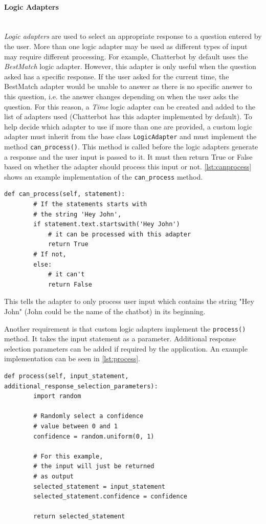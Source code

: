 \documentclass[12pt,a4paper]{article}
\newcommand{\myparagraph}[1]{\paragraph{#1}\mbox{}\\} %
\begin{document}
\myparagraph{Logic Adapters}
\textit{Logic adapters} are used to select an appropriate response to a question entered by the user. More than one logic adapter may be used as different types of input may require different processing. For example, Chatterbot by default uses the \textit{BestMatch} logic adapter. However, this adapter is only useful when the question asked has a specific response. If the user asked for the current time, the BestMatch adapter would be unable to answer as there is no specific answer to this question, i.e. the answer changes depending on when the user asks the question. For this reason, a \textit{Time} logic adapter can be created and added to the list of adapters used (Chatterbot has this adapter implemented by default). To help decide which adapter to use if more than one are provided, a custom logic adapter must inherit from the base class \texttt{LogicAdapter} and must implement the method \texttt{can\_process()}. This method is called before the logic adapters generate a response and the user input is passed to it. It must then return True or False based on whether the adapter should process this input or not. \cref{lst:canprocess} shows an example implementation of the \texttt{can\_process} method.

\begin{lstlisting}[caption={\small{\textit{Example implementation of the can\_process method. Adapted from \cite{Chatterbot:online}}}}, label={lst:canprocess}]
    def can_process(self, statement):
        # If the statements starts with
        # the string 'Hey John',
        if statement.text.startswith('Hey John')
            # it can be processed with this adapter
            return True
        # If not,
        else:
            # it can't
            return False
\end{lstlisting}

This tells the adapter to only process user input which contains the string "Hey John" (John could be the name of the chatbot) in its beginning.

Another requirement is that custom logic adapters implement the \texttt{process()} method. It takes the input statement as a parameter. Additional response selection parameters can be added if required by the application. An example implementation can be seen in \cref{lst:process}.

\begin{lstlisting}[caption={\small{\textit{Example implementation of the process() method. Adapted from \cite{Chatterbot:online}}}}, label={lst:process}]
    def process(self, input_statement, additional_response_selection_parameters):
        import random

        # Randomly select a confidence 
        # value between 0 and 1
        confidence = random.uniform(0, 1)

        # For this example, 
        # the input will just be returned
        # as output
        selected_statement = input_statement
        selected_statement.confidence = confidence

        return selected_statement
\end{lstlisting}
\end{document}

